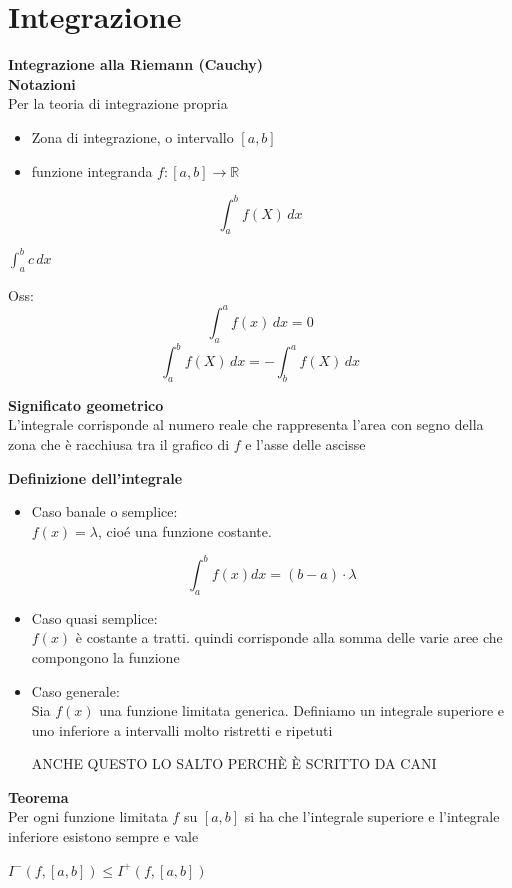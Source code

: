 \documentclass[12pt, a4paper]{article}
\begin{document}
\newpage
\section{Integrazione}
\textbf{Integrazione alla Riemann (Cauchy)\\Notazioni}\\Per la teoria di integrazione propria
\begin{itemize}
    \item Zona di integrazione, o intervallo $[a,b]$
    \item funzione integranda $f:[a,b]\to\mathbb{R}$
\end{itemize}
\begin{center}
    \[ \int_{a}^{b} f(X) \,dx \]

    $\int_{a}^{b} c \,dx $
\end{center}

Oss:
\[ \int_{a}^{a} f(x) \,dx = 0 \]
\[ \int_{a}^{b} f(X) \,dx = -\int_{b}^{a} f(X) \,dx \]

\textbf{Significato geometrico}\\L'integrale corrisponde al numero reale che rappresenta l'area con segno della
zona che è racchiusa tra il grafico di $f$ e l'asse delle ascisse

\textbf{Definizione dell'integrale}
\begin{itemize}
    \item Caso banale o semplice:\\$f(x)=\lambda$, cioé una funzione costante. \begin{center}
              \[\int_{a}^{b}f(x)dx=(b-a)\cdot\lambda\]
          \end{center}
    \item Caso quasi semplice:\\ $f(x)$ è costante a tratti. quindi corrisponde alla somma delle varie
          aree che compongono la funzione
    \item Caso generale:\\Sia $f(x)$ una funzione limitata generica. Definiamo un integrale superiore e uno inferiore
          a intervalli molto ristretti e ripetuti

          ANCHE QUESTO LO SALTO PERCHÈ È SCRITTO DA CANI
\end{itemize}

\textbf{Teorema}\\Per ogni funzione limitata $f$ su $[a,b]$ si ha che l'integrale superiore e l'integrale inferiore
esistono sempre e vale
\begin{center}
    $I^{-}(f,[a,b])\leq I^{+}(f,[a,b])$
\end{center}
\end{document}
